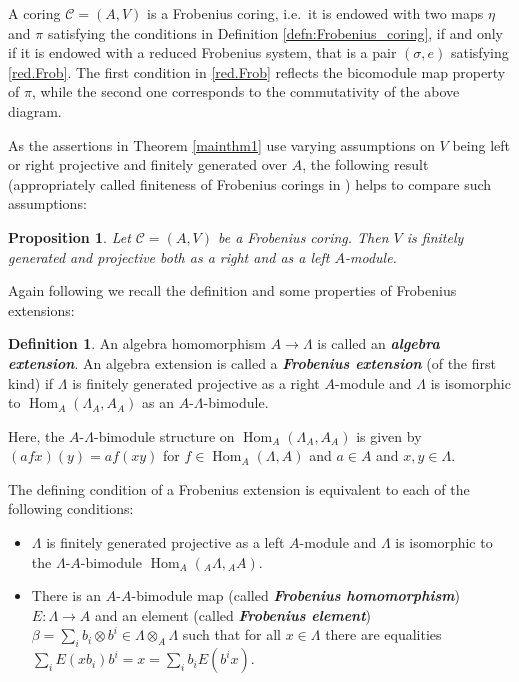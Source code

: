 \documentclass[12pt,a4paper]{amsart}
\theoremstyle{plain}
\newtheorem{prop}[thm]{Proposition}
\theoremstyle{definition}
\newtheorem{defn}[thm]{Definition}
\numberwithin{equation}{thm}
\newcommand{\emphbf}[1]{\emph{\textbf{#1}}}
\DeclareMathOperator{\Hom}{Hom}
\begin{document}
A coring $\mathcal{C}=(A,V)$ is a Frobenius coring, i.e.~it is endowed with two maps $\eta$ and $\pi$ satisfying the conditions in Definition \ref{defn:Frobenius_coring}, if and only if it is endowed with a reduced Frobenius system, that is a pair $(\sigma,e)$ satisfying \eqref{red.Frob}. The first condition in \eqref{red.Frob} reflects the bicomodule map property of $\pi$, while the second one corresponds to the commutativity of the above diagram.

As the assertions in Theorem \ref{mainthm1} use varying assumptions on
$V$ being left or right projective and finitely generated over $A$, the
following result (appropriately called finiteness of Frobenius
corings in \cite[27.9]{BW03}) helps to compare such assumptions:

\begin{prop} \label{frobfinite}
  Let $\mathcal{C}=(A,V)$ be a Frobenius coring. Then $V$ is finitely generated and
  projective both as a right and as a left $A$-module.
\end{prop}

Again following \cite[Section 27]{BW03} we recall the definition and some
properties of Frobenius extensions:

\begin{defn}
  An algebra homomorphism $A \rightarrow \Lambda$ is called an \emphbf{algebra 
    extension}. An algebra extension is called a \emphbf{Frobenius extension}
   (of the first kind) if $\Lambda$ is  finitely generated projective as a
  right $A$-module and $\Lambda$ is isomorphic to $\Hom_A(\Lambda_A,A_A)$ as an
  $A$-$\Lambda$-bimodule.
\end{defn}

Here, the $A$-$\Lambda$-bimodule structure on $\Hom_A(\Lambda_A,A_A)$ is given by
$(afx)(y)=af(xy)$ for $f \in \Hom_A(\Lambda,A)$ and $a \in A$ and
$x,y \in \Lambda$. 

The defining condition of a Frobenius extension is equivalent to each of
the following conditions: 
\begin{itemize}
\item $\Lambda$ is finitely generated projective as a left $A$-module and $\Lambda$
is isomorphic to the $\Lambda$-$A$-bimodule $\Hom_A({}_A\Lambda,{}_AA)$. 
\item There is an $A$-$A$-bimodule map (called \emphbf{Frobenius homomorphism}) $E\colon \Lambda
\rightarrow A$ and an element (called \emphbf{Frobenius element})
$\beta = \sum_i b_i \otimes b^i \in \Lambda \otimes_A
\Lambda$  such that for all $x \in \Lambda$ there
are equalities $\sum_i E(xb_i)b^i = x = \sum_i b_i E(b^i x)$.
\end{itemize}
\end{document}
